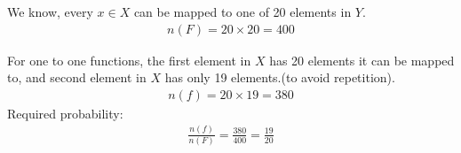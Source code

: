 We know, every $x \in X$ can be mapped to one of 20 elements in $Y$.
\begin{align}
    n(F) = 20 \times 20 = 400
\end{align}

For one to one functions,  the first element in $X$ has 20 elements it can be mapped to, and second element in $X$ has only 19 elements.(to avoid repetition).
\begin{align}
    n(f) = 20 \times 19 = 380
\end{align}
Required probability:
\begin{align}
    \frac{n(f)}{n(F)} = \frac{380}{400} = \frac{19}{20}
\end{align}